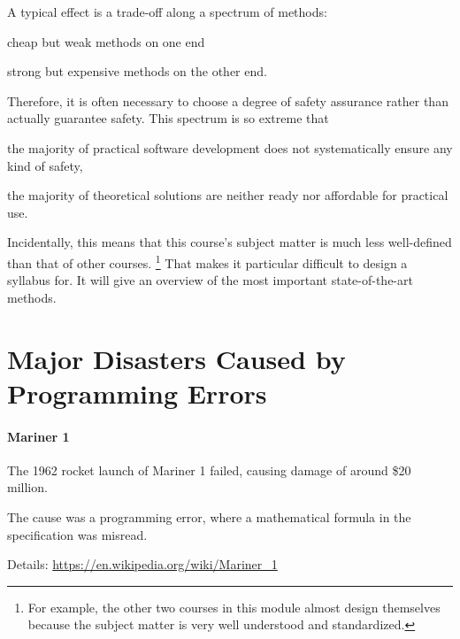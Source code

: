 A typical effect is a trade-off along a spectrum of methods:
\begin{compactitem}
 \item cheap but weak methods on one end
 \item strong but expensive methods on the other end.
\end{compactitem}
Therefore, it is often necessary to choose a degree of safety assurance rather than actually guarantee safety.
This spectrum is so extreme that
\begin{compactitem}
 \item the majority of practical software development does not systematically ensure any kind of safety,
 \item the majority of theoretical solutions are neither ready nor affordable for practical use.
\end{compactitem}

Incidentally, this means that this course's subject matter is much less well-defined than that of other courses.%
\footnote{For example, the other two courses in this module almost design themselves because the subject matter is very well understood and standardized.}
That makes it particular difficult to design a syllabus for.
It will give an overview of the most important state-of-the-art methods.

\section{Major Disasters Caused by Programming Errors}

\paragraph{Mariner 1}
The 1962 rocket launch of Mariner 1 failed, causing damage of around \$20 million.

The cause was a programming error, where a mathematical formula in the specification was misread.

Details: \url{https://en.wikipedia.org/wiki/Mariner_1}

